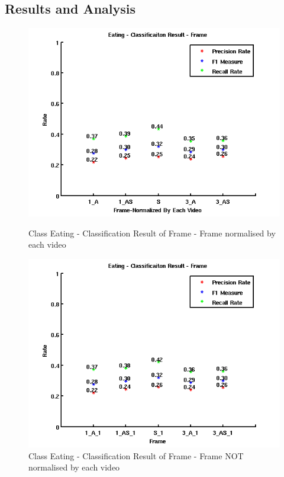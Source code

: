 \subsection{Results and Analysis}
\begin{figure}[ht]
\centering
\begin{minipage}{.5\textwidth}
  \centering
  \captionsetup{justification=centering,margin=1cm}
  \includegraphics[width=\linewidth]{imgs/Result_Eating_Frame.png}
  \caption{Class Eating - Classification Result of Frame - Frame normalised by each video}
  \label{fig:REF}
\end{minipage}%
\begin{minipage}{.5\textwidth}
  \centering
  \captionsetup{justification=centering,margin=1cm}
  \includegraphics[width=\linewidth]{imgs/Result_Eating_Frame_1.png}
  \caption{Class Eating - Classification Result of Frame - Frame NOT normalised by each video}
  \label{fig:REF1}
\end{minipage}
\end{figure}
